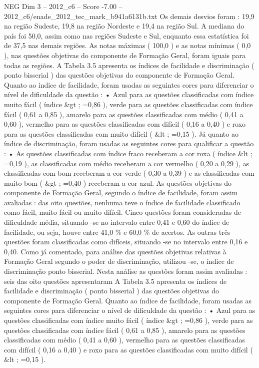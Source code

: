 \begin{textsample}{NEG Dim 3 – 2012\_c6 – Score -7.00 – 2012\_c6/enade\_2012\_tec\_mark\_b941a6131b.txt}
Os demais desvios foram : 19,9 na região Sudeste, 19,8 na região Nordeste e 19,4 na região Sul.
A mediana do país foi 50,0, assim como nas regiões Sudeste e Sul, enquanto essa estatística foi de 37,5 nas demais regiões.
As notas máximas ( 100,0 ) e as notas mínimas ( 0,0 ), nas questões objetivas do componente de Formação Geral, foram iguais para todas as regiões.
A Tabela 3.5 apresenta os índices de facilidade e discriminação ( ponto bisserial ) das questões objetivas do componente de Formação Geral.
Quanto ao índice de facilidade, foram usadas as seguintes cores para diferenciar o nível de dificuldade da questão : • Azul para as questões classificadas com índice muito fácil ( índice \&gt ; =0,86 ), verde para as questões classificadas com índice fácil ( 0,61 a 0,85 ), amarelo para as questões classificadas com médio ( 0,41 a 0,60 ), vermelho para as questões classificadas com difícil ( 0,16 a 0,40 ) e roxo para as questões classificadas com muito difícil ( \&lt ; =0,15 ).
Já quanto ao índice de discriminação, foram usadas as seguintes cores para qualificar a questão : • As questões classificadas com índice fraco receberam a cor roxa ( índice \&lt ; =0,19 ), as classificadas com médio receberam a cor vermelho ( 0,20 a 0,29 ), as classificadas com bom receberam a cor verde ( 0,30 a 0,39 ) e as classificadas com muito bom ( \&gt ; =0,40 ) receberam a cor azul.
As questões objetivas do componente de Formação Geral, segundo o índice de facilidade, foram assim avaliadas : das oito questões, nenhuma teve o índice de facilidade classificado como fácil, muito fácil ou muito difícil.
Cinco questões foram consideradas de dificuldade média, situando -se no intervalo entre 0,41 e 0,60 do índice de facilidade, ou seja, houve entre 41,0 \% e 60,0 \% de acertos.
As outras três questões foram classificadas como difíceis, situando -se no intervalo entre 0,16 e 0,40.
Como já comentado, para análise das questões objetivas relativas à Formação Geral segundo o poder de discriminação, utilizou -se, o índice de discriminação ponto bisserial.
Nesta análise as questões foram assim avaliadas : seis das oito questões apresentaram A Tabela 3.5 apresenta os índices de facilidade e discriminação ( ponto bisserial ) das questões objetivas do componente de Formação Geral.
Quanto ao índice de facilidade, foram usadas as seguintes cores para diferenciar o nível de dificuldade da questão : • Azul para as questões classificadas com índice muito fácil ( índice \&gt ; =0,86 ), verde para as questões classificadas com índice fácil ( 0,61 a 0,85 ), amarelo para as questões classificadas com médio ( 0,41 a 0,60 ), vermelho para as questões classificadas com difícil ( 0,16 a 0,40 ) e roxo para as questões classificadas com muito difícil ( \&lt ; =0,15 ).

\end{textsample}
